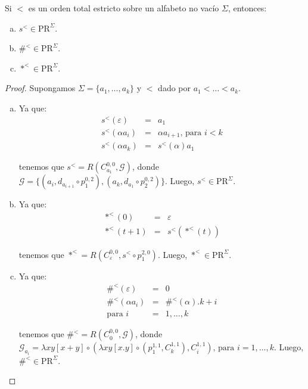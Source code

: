   \begin{lemma}
    \PN Si $<$ es un orden total estricto sobre un alfabeto no vacío $\Sigma$, entonces:

    \begin{enumerate}[a)]
      \item $s^{<} \in \mathrm{PR}^{\Sigma}$.
      \item $\#^{<} \in \mathrm{PR}^{\Sigma}$.
      \item $\ast^{<} \in \mathrm{PR}^{\Sigma}$.
    \end{enumerate}
  \end{lemma}
  \begin{proof}
    \PN Supongamos $\Sigma = \{a_{1}, \dotsc, a_{k}\}$ y $<$ dado por $a_{1} < \dotsc < a_{k}$.

    \begin{enumerate}[a)]
      \item Ya que:
        \begin{eqnarray*}
          s^{<}(\varepsilon) &=& a_{1} \\
          s^{<}(\alpha a_{i}) &=& \alpha a_{i+1} \text{, para } i < k \\
          s^{<}(\alpha a_{k}) &=& s^{<}(\alpha) a_{1}
        \end{eqnarray*}

        \PN tenemos que $s^{<} = R(C_{a_{1}}^{0, 0}, \mathcal{G})$, donde $\mathcal{G} = \{\left(a_{i}, d_{a_{i+1}}
        \circ p_{1}^{0,2} \right), \left(a_{k}, d_{a_{1}} \circ p_{2}^{0,2} \right)\}$. Luego, $s^{<} \in
        \mathrm{PR}^{\Sigma}$.

      \item Ya que:
        \begin{eqnarray*}
          \ast^{<}(0) &=& \varepsilon \\
          \ast^{<}(t+1) &=& s^{<}(\ast^{<}(t))
        \end{eqnarray*}

        \PN tenemos que $\ast^{<} = R(C_{\varepsilon}^{0,0}, s^{<} \circ p_{1}^{2,0})$. Luego, $\ast^{<} \in
        \mathrm{PR}^{\Sigma}$.

      \item Ya que:
        \begin{eqnarray*}
          \#^{<}(\varepsilon) &=& 0 \\
          \#^{<}(\alpha a_{i}) &=& \#^{<}(\alpha). k + i \\
          \text{para } i &=& 1, \dotsc, k
        \end{eqnarray*}

        \PN tenemos que $\#^{<} = R(C_{0}^{0, 0}, \mathcal{G})$, donde $\mathcal{G}_{a_{i}} = \lambda xy
        \left[x+y\right] \circ (\lambda xy \left[x.y\right] \circ (p_{1}^{1, 1}, C_{k}^{1, 1}), C_{i}^{1, 1})
        \text{, para } i = 1, \dotsc, k$. Luego, $\#^{<} \in \mathrm{PR}^{\Sigma}$.
    \end{enumerate}
  \end{proof}

